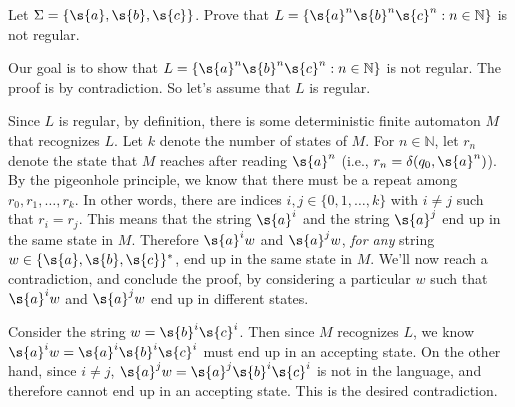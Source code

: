 \begin{flex}
\begin{exercise} \label{exercise:anbncn-is-not-regular} 
Let $\Sigma = \{\s{a},\s{b},\s{c}\}$. Prove that $L = \{\s{a}^n\s{b}^n\s{c}^n: n \in \mathbb{N}\}$ is not regular.
\end{exercise}

\begin{solution}
Our goal is to show that $L = \{\s{a}^n\s{b}^n\s{c}^n: n \in \mathbb{N}\}$ is not regular. The proof is by contradiction. So let's assume that $L$ is regular. 

Since $L$ is regular, by definition, there is some deterministic finite automaton $M$ that recognizes $L$. Let $k$ denote the number of states of $M$. For $n \in \mathbb{N}$, let $r_n$ denote the state that $M$ reaches after reading $\s{a}^n$ (i.e., $r_n = \delta(q_0, \s{a}^n)$). By the pigeonhole principle, we know that there must be a repeat among $r_0, r_1,\ldots, r_k$. In other words, there are indices $i, j \in \{0,1,\ldots,k\}$ with $i \neq j$ such that $r_i = r_j$. This means that the string $\s{a}^i$ and the string $\s{a}^j$ end up in the same state in $M$. Therefore $\s{a}^iw$ and $\s{a}^jw$, \emph{for any} string $w \in \{\s{a},\s{b},\s{c}\}^*$, end up in the same state in $M$. We'll now reach a contradiction, and conclude the proof, by considering a particular $w$ such that $\s{a}^iw$ and $\s{a}^jw$ end up in different states. 

Consider the string $w = \s{b}^i\s{c}^i$. Then since $M$ recognizes $L$, we know $\s{a}^iw = \s{a}^i\s{b}^i\s{c}^i$ must end up in an accepting state. On the other hand, since $i \neq j$, $\s{a}^jw = \s{a}^j\s{b}^i\s{c}^i$ is not in the language, and therefore cannot end up in an accepting state. This is the desired contradiction.
\end{solution}
\end{flex}


